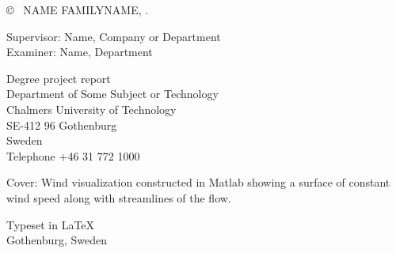 \copyright ~ NAME FAMILYNAME, \the\year. \setlength{\parskip}{1cm}

Supervisor: Name, Company or Department\\
Examiner: Name, Department \setlength{\parskip}{1cm}

Degree project report \the\year\\	
Department of Some Subject or Technology\\
Chalmers University of Technology\\
SE-412 96 Gothenburg\\
Sweden\\
Telephone +46 31 772 1000 \setlength{\parskip}{0.5cm}

\vfill
Cover: Wind visualization constructed in Matlab showing a surface of constant wind speed along with streamlines of the flow. \setlength{\parskip}{0.5cm}

Typeset in \LaTeX \tagtemp\\
Gothenburg, Sweden \the\year
